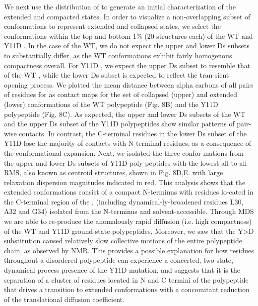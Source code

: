 We next use the distribution of \diffusion to generate an initial characterization of the extended and compacted states. In order to visualize a non-overlapping subset of conformations to represent extended and collapsed states, we select the conformations within the top and bottom 1\% (20 structures each) of the WT \gct and Y11D \gct. In the case of the WT, we do not expect the upper and lower Ds subsets to substantially differ, as the WT \gct conformations exhibit fairly homogenous compactness overall. For Y11D \gct, we expect the upper Ds subset to resemble that of the WT \gct, while the lower Ds subset is expected to reflect the tran-sient opening process. We plotted the mean distance between alpha carbons of all pairs of residues for as contact maps for the set of collapsed (upper) and extended (lower) conformations of the WT \gct polypeptide (Fig. 8B) and the Y11D \gct polypeptide (Fig. 8C).   As expected, the upper and lower Ds subsets of the WT \gct and the upper Ds subset of the Y11D \gct polypeptides show similar patterns of pair-wise contacts.  In contrast, the C-terminal residues in the lower Ds subset of the Y11D \gct lose the majority of contacts with N terminal residues, as a consequence of the conformational expansion. Next, we isolated the three confor-mations from the upper and lower Ds subsets of  Y11D \gct poly-peptides with the lowest all-to-all RMS, also known as centroid structures, shown in Fig. 8D,E. with large relaxation dispersion magnitudes indicated in red. This analysis shows that the extended conformations consist of a compact N-terminus with residues lo-cated in the C-terminal region of the \gct, (including dynamical-ly-broadened residues L30, A32 and G34) isolated from the N-terminus and solvent-accessible. Through MDS we are able to re-produce the anomalously rapid diffusion (i.e. high compactness) of the WT and Y11D ground-state \gct polypeptides. Moreover, we saw that the Y>D substitution caused relatively slow collective motions of the entire polypeptide chain, as observed by NMR. This provides a possible explanation for how residues throughout a disordered polypeptide can experience a concerted, two-state, dynamical process presence of the Y11D mutation, and suggests that it is the separation of a cluster of residues located in N and C termini of the \gct  polypeptide that drives a transition to extended conformations with a concomitant  reduction of the translational diffusion coefficient.


\begin{figure}
\centering     %
{}
\end{figure}




